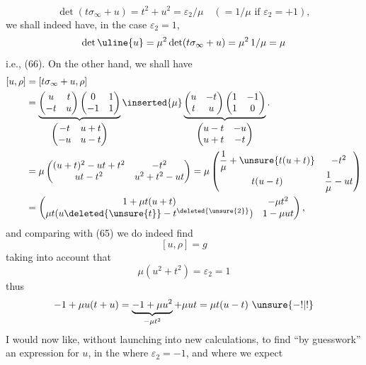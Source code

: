 \[
\det(t\sigma_\infty+u)=t^2+u^2=\varepsilon_2/\mu
\quad(=1/\mu\text{ if }\varepsilon_2=+1),
\]
we shall indeed have, in the case $\varepsilon_2=1$, 
\[
\det\uline{u}=\mu^2\det(t\sigma_\infty+u)=\mu^2\,1/\mu=\mu
\]
i.e., (66). On the other hand, we shall have
\[
\begin{aligned}
[u,\rho]&=[t\sigma_\infty+u,\rho]\\
&=
\underbrace{
\begin{pmatrix}u&t\\-t&u\end{pmatrix}
\begin{pmatrix}0&1\\-1&1\end{pmatrix}
}_{\begin{pmatrix}-t&u+t\\-u&u-t\end{pmatrix}}
\inserted{\mu}
\underbrace{
\begin{pmatrix}u&-t\\t&u\end{pmatrix}
\begin{pmatrix}1&-1\\1&0\end{pmatrix}
}_{\begin{pmatrix}u-t&-u\\u+t&-t\end{pmatrix}}.
\\
&=\mu\begin{pmatrix}
(u+t)^2-ut+t^2&-t^2\\
ut-t^2&u^2+t^2-ut
\end{pmatrix}
=\mu\begin{pmatrix}
\dfrac1\mu+\unsure{t(u+t)}&-t^2\\
t(u-t)&\dfrac1\mu-ut
\end{pmatrix}
\\
&=\begin{pmatrix}
1+\mu t(u+t)&-\mu t^2\\
\mu t(u\deleted{\unsure{t}}-t^{\deleted{\unsure{2}}})&1-\mu ut
\end{pmatrix},
\end{aligned}
\]
and comparing with (65) we do indeed find
\[
[u,\rho]=g
\]
taking into account that
\[
\mu(u^2+t^2)=\varepsilon_2=1
\]
thus
\[
-1+\mu u(t+u)=\underbrace{-1+\mu u^2}_{-\mu t^2}+\mu ut
=\mu t(u-t)\ \unsure{-!|!}
\]
I would now like, without launching into
new calculations, to find ``by guesswork'' an expression
for $u$, in the  where $\varepsilon_2=-1$, and where we expect
